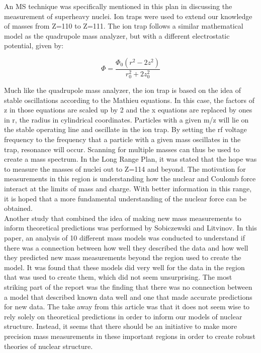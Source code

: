 \documentclass[12pt]{amsart}
\begin{document}
An MS technique was specifically mentioned in this plan in discussing the measurement of superheavy nuclei. Ion traps were used to extend our knowledge of masses from Z=110 to Z=111. \cite{lrp} The ion trap follows a similar mathematical model as the quadrupole mass analyzer, but with a different electrostatic potential, given by:

\begin{equation}
\Phi =\frac {\Phi_0(r^2-2z^2)}{r_0^2+2z_0^2}
\end{equation}

Much like the quadrupole mass analyzer, the ion trap is based on the idea of stable oscillations according to the Mathieu equations. In this case, the factors of z in those equations are scaled up by 2 and the x equations are replaced by ones in r, the radius in cylindrical coordinates. Particles with a given m/z will lie on the stable operating line and oscillate in the ion trap. By setting the rf voltage frequency to the frequency that a particle with a given mass oscillates in the trap, resonance will occur. Scanning for multiple masses can thus be used to create a mass spectrum. \cite{paul} In the Long Range Plan, it was stated that the hope was to measure the masses of nuclei out to Z=114 and beyond. The motivation for measurements in this region is understanding how the nuclear and Coulomb force interact at the limits of mass and charge. With better information in this range, it is hoped that a more fundamental understanding of the nuclear force can be obtained. \cite{lrp}\\

Another study that combined the idea of making new mass measurements to inform theoretical predictions was performed by Sobiczewski and Litvinov. In this paper, an analysis of 10 different mass models was conducted to understand if there was a connection between how well they described the data and how well they predicted new mass measurements beyond the region used to create the model. It was found that these models did very well for the data in the region that was used to create them, which did not seem unsurprising. The most striking part of the report was the finding that there was no connection between a model that described known data well and one that made accurate predictions for new data. \cite{sobi} The take away from this article was that it does not seem wise to rely solely on theoretical predictions in order to inform our models of nuclear structure. Instead, it seems that there should be an initiative to make more precision mass measurements in these important regions in order to create robust theories of nuclear structure.
\end{document}

